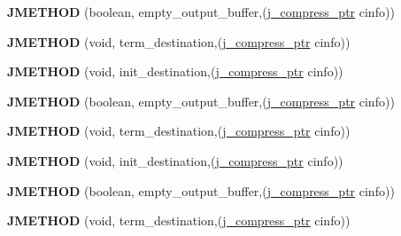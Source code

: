 \begin{DoxyCompactItemize}
\item 
\mbox{\label{structjpeg__destination__mgr_a7357b5d5cab543cfa243dd59f101b8f2}} 
{\bfseries J\+M\+E\+T\+H\+OD} (boolean, empty\+\_\+output\+\_\+buffer,(\hyperlink{structjpeg__compress__struct}{j\+\_\+compress\+\_\+ptr} cinfo))
\item 
\mbox{\label{structjpeg__destination__mgr_a1158df5e49ecfa2a7d0905eef216afbf}} 
{\bfseries J\+M\+E\+T\+H\+OD} (void, term\+\_\+destination,(\hyperlink{structjpeg__compress__struct}{j\+\_\+compress\+\_\+ptr} cinfo))
\item 
\mbox{\label{structjpeg__destination__mgr_ae29d14eb632140c7c67eda8c5824383c}} 
{\bfseries J\+M\+E\+T\+H\+OD} (void, init\+\_\+destination,(\hyperlink{structjpeg__compress__struct}{j\+\_\+compress\+\_\+ptr} cinfo))
\item 
\mbox{\label{structjpeg__destination__mgr_a7357b5d5cab543cfa243dd59f101b8f2}} 
{\bfseries J\+M\+E\+T\+H\+OD} (boolean, empty\+\_\+output\+\_\+buffer,(\hyperlink{structjpeg__compress__struct}{j\+\_\+compress\+\_\+ptr} cinfo))
\item 
\mbox{\label{structjpeg__destination__mgr_a1158df5e49ecfa2a7d0905eef216afbf}} 
{\bfseries J\+M\+E\+T\+H\+OD} (void, term\+\_\+destination,(\hyperlink{structjpeg__compress__struct}{j\+\_\+compress\+\_\+ptr} cinfo))
\item 
\mbox{\label{structjpeg__destination__mgr_ae29d14eb632140c7c67eda8c5824383c}} 
{\bfseries J\+M\+E\+T\+H\+OD} (void, init\+\_\+destination,(\hyperlink{structjpeg__compress__struct}{j\+\_\+compress\+\_\+ptr} cinfo))
\item 
\mbox{\label{structjpeg__destination__mgr_a7357b5d5cab543cfa243dd59f101b8f2}} 
{\bfseries J\+M\+E\+T\+H\+OD} (boolean, empty\+\_\+output\+\_\+buffer,(\hyperlink{structjpeg__compress__struct}{j\+\_\+compress\+\_\+ptr} cinfo))
\item 
\mbox{\label{structjpeg__destination__mgr_a1158df5e49ecfa2a7d0905eef216afbf}} 
{\bfseries J\+M\+E\+T\+H\+OD} (void, term\+\_\+destination,(\hyperlink{structjpeg__compress__struct}{j\+\_\+compress\+\_\+ptr} cinfo))
\end{DoxyCompactItemize}
